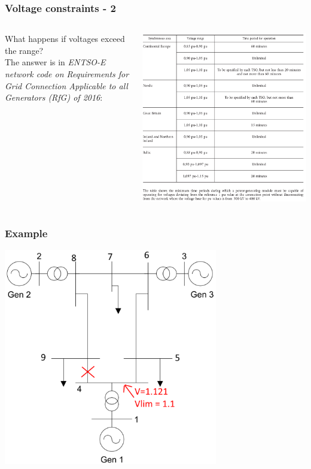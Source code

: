 \documentclass[compress]{beamer}
\begin{document}
\begin{frame}
  \frametitle{Voltage constraints - 2}
\begin{columns}
\begin{column}{0.3\textwidth}
What happens if voltages exceed the range?\\
The answer is in \emph{ENTSO-E network code on Requirements for Grid Connection Applicable to all Generators (RfG) of 2016}:   
\end{column}
\begin{column}{0.7\textwidth}
\includegraphics[width=1\textwidth]{Figs/ENTSOE-NCOS-EmergencyVoltageRanges.png}
\end{column}
\end{columns}
\end{frame}

\begin{frame}
  \frametitle{Example}
\includegraphics[width=0.7\textwidth]{Figs/ieee9_fault_line_4-9_voltages.png}
\end{frame}
\end{document}
